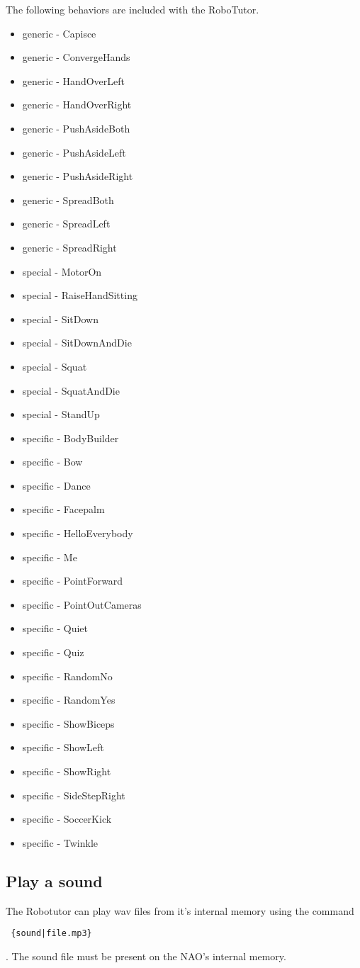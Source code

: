 The following behaviors are included with the RoboTutor. %
\begin{itemize}
\itemsep0em 
\item generic - Capisce
\item generic - ConvergeHands
\item generic - HandOverLeft
\item generic - HandOverRight
\item generic - PushAsideBoth
\item generic - PushAsideLeft
\item generic - PushAsideRight
\item generic - SpreadBoth
\item generic - SpreadLeft
\item generic - SpreadRight
\item special - MotorOn
\item special - RaiseHandSitting
\item special - SitDown
\item special - SitDownAndDie
\item special - Squat
\item special - SquatAndDie
\item special - StandUp
\item specific - BodyBuilder
\item specific - Bow
\item specific - Dance
\item specific - Facepalm
\item specific - HelloEverybody
\item specific - Me
\item specific - PointForward
\item specific - PointOutCameras
\item specific - Quiet
\item specific - Quiz
\item specific - RandomNo
\item specific - RandomYes
\item specific - ShowBiceps
\item specific - ShowLeft
\item specific - ShowRight
\item specific - SideStepRight
\item specific - SoccerKick
\item specific - Twinkle
\end{itemize}

\subsection{Play a sound}
The Robotutor can play wav files from it's internal memory using the command \begin{verbatim} {sound|file.mp3} \end{verbatim}. The sound file must be present on the NAO's internal memory.

